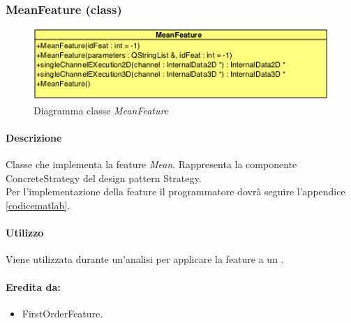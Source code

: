 \subsubsection{MeanFeature (class)}
\label{MeanFeature}
\begin{figure}[!h]
\centering
			\includegraphics[scale=1]{./Content/Immagini/modelCore/MeanFeature.png}
			\caption{Diagramma classe \textsl{MeanFeature}}
			\label{meanFeature_img}
\end{figure}

\paragraph{Descrizione \\} Classe che implementa la feature\g{} \textit{Mean}. Rappresenta la componente ConcreteStrategy del design pattern\g{} Strategy.
\\Per l'implementazione della feature\g{} il programmatore dovrà seguire l'appendice \ref{codicematlab}.

\paragraph{Utilizzo\\} Viene utilizzata durante un'analisi per applicare la feature\g{} a un \dataset{}.

\paragraph{Eredita da:}
\begin{itemize}
	\item FirstOrderFeature.
\end{itemize}

